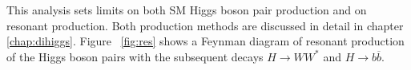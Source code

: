 \indent This analysis sets limits on both SM Higgs boson pair production and on resonant production. Both production methods are discussed in detail in chapter \ref{chap:dihiggs}. Figure ~\ref{fig:res} shows a Feynman diagram of resonant production of the Higgs boson pairs with the subsequent decays ${H\rightarrow WW^{*}}$ and ${H\rightarrow b\overline{b}}$.
